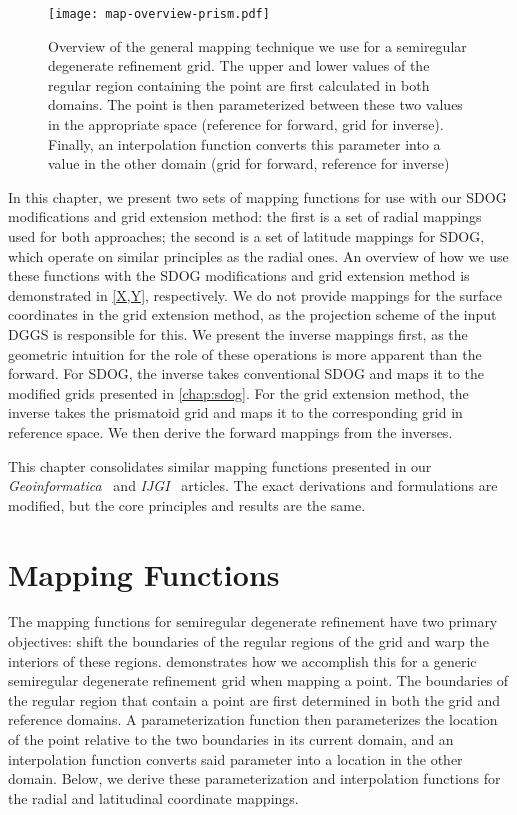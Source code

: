 \begin{figure}[ht!]
	\centering
	\texttt{[image: map-overview-prism.pdf]}
	\caption[Overview of mapping for semiregular degenerate refinement grids]{
		Overview of the general mapping technique we use for a semiregular degenerate refinement grid.
		The upper and lower values of the regular region containing the point are first calculated in both domains.
		The point is then parameterized between these two values in the appropriate space (reference for forward, grid for inverse).
		Finally, an interpolation function converts this parameter into a value in the other domain (grid for forward, reference for inverse)
	}
	\label{fig:map-overview-prism}
\end{figure}\textbf{}


In this chapter, we present two sets of mapping functions for use with our SDOG modifications and grid extension method:
the first is a set of radial mappings used for both approaches;
the second is a set of latitude mappings for SDOG, which operate on similar principles as the radial ones.
An overview of how we use these functions with the SDOG modifications and grid extension method is demonstrated in \cref{X,Y}, respectively.
We do not provide mappings for the surface coordinates in the grid extension method, as the projection scheme of the input DGGS is responsible for this.
We present the inverse mappings first, as the geometric intuition for the role of these operations is more apparent than the forward.
For SDOG, the inverse takes conventional SDOG and maps it to the modified grids presented in \cref{chap:sdog}.
For the grid extension method, the inverse takes the prismatoid grid and maps it to the corresponding grid in reference space.
We then derive the forward mappings from the inverses.


This chapter consolidates similar mapping functions presented in our \textit{Geoinformatica}~\cite{ulmer2020toward} and \textit{IJGI}~\cite{ulmer2020general} articles.
The exact derivations and formulations are modified, but the core principles and results are the same.


\section{Mapping Functions} \label{chap:6:functions}
The mapping functions for semiregular degenerate refinement have two primary objectives: shift the boundaries of the regular regions of the grid and warp the interiors of these regions.
 demonstrates how we accomplish this for a generic semiregular degenerate refinement grid when mapping a point.
The boundaries of the regular region that contain a point are first determined in both the grid and reference domains.
A parameterization function then parameterizes the location of the point relative to the two boundaries in its current domain, and an interpolation function converts said parameter into a location in the other domain.
Below, we derive these parameterization and interpolation functions for the radial and latitudinal coordinate mappings.


